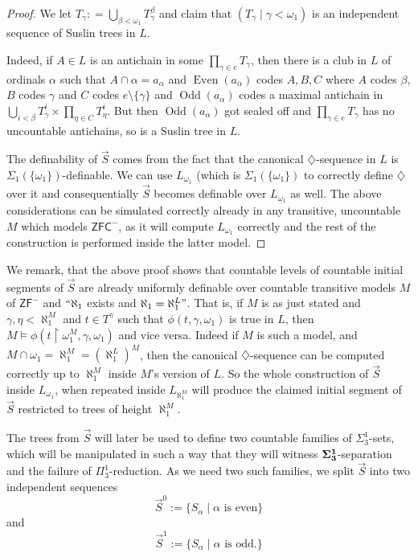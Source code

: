 \documentclass[a4paper,11pt]{article}
\newcommand{\ZFC}{\mathsf{ZFC}}
\newcommand{\ZFP}{\mathsf{ZF}^-}
\begin{document}
\begin{proof}
We let $T_{\gamma}: = \bigcup_{\beta < \omega_1} T^{\beta}_{\gamma}$ and claim that 
$(T_{\gamma} \mid \gamma < \omega_1)$ is an independent sequence of Suslin trees in $L$.

Indeed, if $A \in L$ is an antichain in some $\prod_{\gamma \in e} T_{\gamma}$, then there is a club in $L$ of ordinals $\alpha$ such that $A \cap \alpha= a_{\alpha}$ and $\operatorname{E ven}(a_{\alpha})$ codes $A,B,C$ where $A$ codes $\beta$, $B$ codes $\gamma$ and $C$ codes $e \setminus \{\gamma\}$ and $\operatorname{Odd} (a_{\alpha})$ codes a maximal antichain in $\bigcup_{i < \beta } T_{\gamma}^i \times \prod_{\eta \in C} T_{\eta}^i$. But then $\operatorname{Odd} (a_{\alpha})$ got sealed off and $\prod_{\gamma \in e} T_{\gamma}$ has no uncountable antichains, so is a Suslin tree in $L$.


The definability of $\vec{S}$ comes from the fact that the canonical $\diamondsuit$-sequence in $L$ is $\Sigma_1 (\{ \omega_1 \})$-definable. We can use $L_{\omega_1}$ (which is $\Sigma_1( \{\omega_1 \} )$ to correctly define $\diamondsuit$ over it and consequentially $\vec{S}$ becomes definable over $L_{\omega_1}$ as well. The above considerations can be simulated correctly already in any transitive, uncountable $M$ which models $\ZFC^{-}$, as it will compute $L_{\omega_1}$ correctly and the rest of the construction is performed inside the latter model. 
\end{proof}


We remark, that the above proof shows that countable levels of countable initial segments of $\vec{S}$ are already uniformly definable over countable transitive models $M$ of $\ZFP$ and $``\aleph_1$ exists and $\aleph_1= \aleph_1^L"$.
That is, if $M$ is as just stated and $\gamma, \eta<\aleph_1^M$ and $t \in T^{\gamma}$ such that $\phi(t,\gamma,\omega_1)$ is true in $L$, then $M \models \phi (t \upharpoonright \omega_1^M,\gamma,\omega_1)$ and vice versa. Indeed if $M$ is such a model, and $ M \cap \omega_1=\aleph_1^M= (\aleph_1^L)^M$, then
the canonical $\diamondsuit$-sequence can be computed correctly up to $\aleph_1^M$ inside $M$'s version of $L$. So the whole construction of $\vec{S}$ inside $L_{\omega_1}$, when repeated inside $L_{\aleph_1^M}$ will produce the claimed initial segment of $\vec{S}$ restricted to trees of height $\aleph_1^M$.


The trees from $\vec{S}$ will later be used to define two countable families of $\Sigma^1_3$-sets, which will be manipulated in such a way that they will witness $\bf{\Sigma}^1_3$-separation and the failure of $\Pi^1_3$-reduction. As we need two such families, we split $\vec{S}$ into two independent sequences
\[ \vec{S}^0 := \{ S_{\alpha} \mid \alpha \text{ is even}\} \]
and
\[\vec{S}^1:= \{ S_{\alpha} \mid \alpha \text{ is odd.} \} \]
\end{document}
